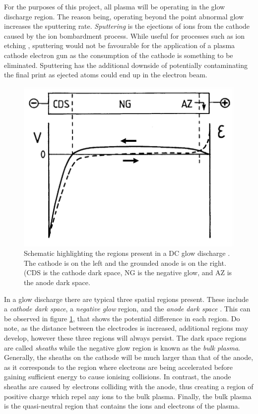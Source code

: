 For the purposes of this project, all plasma will be operating in the glow discharge region. The reason being, operating beyond the point abnormal glow increases the sputtering rate. \textit{Sputtering} is the ejections of ions from the cathode caused by the ion bombardment process. While useful for processes such as ion etching \cite{Lieberman2005}, sputtering would not be favourable for the application of a plasma cathode electron gun as the consumption of the cathode is something to be eliminated. Sputtering has the additional downside of potentially contaminating the final print as ejected atoms could end up in the electron beam. 

\begin{figure}[h!]
	\centering
	\includegraphics[width=0.7\linewidth]{background/figures/glow_discharge.png}
	\caption{Schematic highlighting the regions present in a DC glow discharge \cite{Bogaerts2002}. The cathode is on the left and the grounded anode is on the right. (CDS is the cathode dark space, NG is the negative glow, and AZ is the anode dark space.}
	\label{fig:glow_discharge}
\end{figure}

In a glow discharge there are typical three spatial regions present. These include a \textit{cathode dark space}, a \textit{negative glow} region, and the \textit{anode dark space} \cite{Gudmundsson2017, Bogaerts2002}. This can be observed in figure \ref{fig:glow_discharge}, that shows the potential difference in each region. Do note, as the distance between the electrodes is increased, additional regions may develop, however these three regions will always persist. The dark space regions are called \textit{sheaths} while the negative glow region is known as the \textit{bulk plasma}. Generally, the sheaths on the cathode will be much larger than that of the anode, as it corresponds to the region where electrons are being accelerated before gaining sufficient energy to cause ionising collisions. In contrast, the anode sheaths are caused by electrons colliding with the anode, thus creating a region of positive charge which repel any ions to the bulk plasma. Finally, the bulk plasma is the quasi-neutral region that contains the ions and electrons of the plasma.


